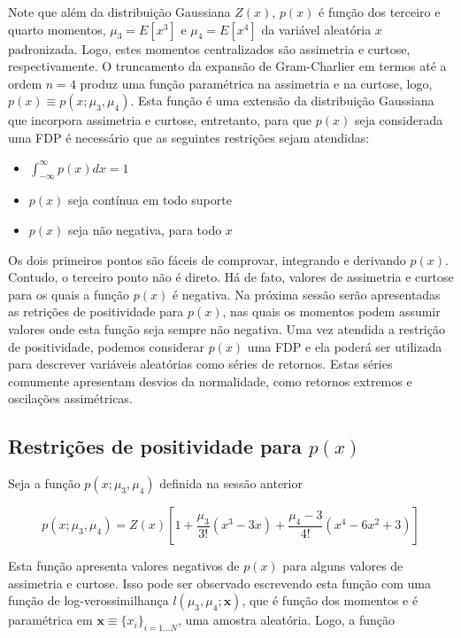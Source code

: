 \documentclass[
  letterpaper,
  DIV=11,
  numbers=noendperiod]{scrartcl}
\providecommand{\tightlist}{%
  \setlength{\itemsep}{0pt}\setlength{\parskip}{0pt}}\usepackage{longtable,booktabs,array}
\begin{document}
Note que além da distribuição Gaussiana \(Z(x)\), \(p(x)\) é função dos
terceiro e quarto momentos, \(\mu_3 = E[x^3]\) e \(\mu_4 = E[x^4]\) da
variável aleatória \(x\) padronizada. Logo, estes momentos centralizados
são assimetria e curtose, respectivamente. O truncamento da expansão de
Gram-Charlier em termos até a ordem \(n=4\) produz uma função
paramétrica na assimetria e na curtose, logo,
\(p(x) \equiv p(x;\mu_3,\mu_4)\). Esta função é uma extensão da
distribuição Gaussiana que incorpora assimetria e curtose, entretanto,
para que \(p(x)\) seja considerada uma FDP é necessário que as seguintes
restrições sejam atendidas:

\begin{itemize}
\tightlist
\item
  \(\int_{-\infty}^{\infty}p(x) dx = 1\)
\item
  \(p(x)\) seja contínua em todo suporte
\item
  \(p(x)\) seja não negativa, para todo \(x\)
\end{itemize}

Os dois primeiros pontos são fáceis de comprovar, integrando e derivando
\(p(x)\). Contudo, o terceiro ponto não é direto. Há de fato, valores de
assimetria e curtose para os quais a função \(p(x)\) é negativa. Na
próxima sessão serão apresentadas as retrições de positividade para
\(p(x)\), nas quais os momentos podem assumir valores onde esta função
seja sempre não negativa. Uma vez atendida a restrição de positividade,
podemos considerar \(p(x)\) uma FDP e ela poderá ser utilizada para
descrever variáveis aleatórias como séries de retornos. Estas séries
comumente apresentam desvios da normalidade, como retornos extremos e
oscilações assimétricas.

\subsection{\texorpdfstring{Restrições de positividade para
\(p(x)\)}{Restrições de positividade para p(x)}}\label{restriuxe7uxf5es-de-positividade-para-px}

Seja a função \(p(x;\mu_3, \mu_4)\) definida na sessão anterior

\[
p(x; \mu_3, \mu_4) = Z(x)\left[ 1 + \frac{\mu_3}{3!} (x^3 - 3x) + \frac{\mu_4 - 3}{4!} (x^4 - 6x^2 + 3) \right]
\]

Esta função apresenta valores negativos de \(p(x)\) para alguns valores
de assimetria e curtose. Isso pode ser observado escrevendo esta função
com uma função de log-verossimilhança \(l(\mu_3, \mu_4; \mathbf{x})\),
que é função dos momentos e é paramétrica em
\(\mathbf{x} \equiv \{x_i\}_{i=1...N}\), uma amostra aleatória. Logo, a
função
\end{document}
